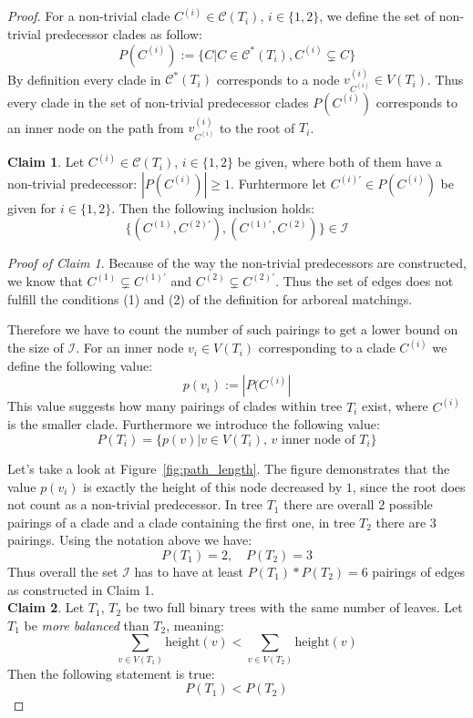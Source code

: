 \begin{proof}
For a non-trivial clade $C^{(i)} \in \mathcal{C}(T_i)$, $i \in \{1,2\}$, we define the set of non-trivial predecessor clades as follow:
$$P(C^{(i)}) := \{C | C \in \mathcal{C}^*(T_i), C^{(i)} \subsetneq C\}$$ 
By definition every clade in $\mathcal{C}^*(T_i)$ corresponds to a node $v^{(i)}_{C^{(i)}} \in V(T_i)$. Thus every clade in the set of non-trivial predecessor clades $P(C^{(i)})$ corresponds to an inner node on the path from $v^{(i)}_{C^{(i)}}$ to the root of $T_i$.

\textbf{Claim 1}. Let $C^{(i)} \in \mathcal{C}(T_i)$, $i \in \{1,2\}$ be given, where both of them have a non-trivial predecessor: $|P(C^{(i)})| \geq 1$. Furhtermore let $C^{(i)'} \in P(C^{(i)})$ be given for $i \in \{1,2\}$. Then the following inclusion holds:
$$ \{(C^{(1)},C^{(2)'}), (C^{(1)'}, C^{(2)})\} \in \mathcal{I}$$

\textit{Proof of Claim 1}. Because of the way the non-trivial predecessors are constructed, we know that $C^{(1)} \subsetneq C^{(1)'}$ and $C^{(2)} \subsetneq C^{(2)'}$. Thus the set of edges does not fulfill the conditions (1) and (2) of the definition for arboreal matchings.

Therefore we have to count the number of such pairings to get a lower bound on the size of $\mathcal{I}$. For an inner node $v_i \in V(T_i)$ corresponding to a clade $C^{(i)}$ we define the following value:
$$p(v_i) := |P(C^{(i)}|$$ 
This value suggests how many pairings of clades within tree $T_i$ exist, where $C^{(i)}$ is the smaller clade. Furthermore we introduce the following value:
$$P(T_i) = \{ p(v) | v \in V(T_i), \, v \text{ inner node of }T_i\} $$

Let's take a look at Figure~\ref{fig:path_length}. The figure demonstrates that the value $p(v_i)$ is exactly the height of this node decreased by $1$, since the root does not count as a non-trivial predecessor. In tree $T_1$ there are overall $2$ possible pairings of a clade and a clade containing the first one, in tree $T_2$ there are 3 pairings. Using the notation above we have:
$$ P(T_1) = 2,\quad P(T_2) = 3$$
Thus overall the set $\mathcal{I}$ has to have at least $P(T_1)*P(T_2)=6$ pairings of edges as constructed in Claim 1.\\

\textbf{Claim 2}. Let $T_1$, $T_2$ be two full binary trees with the same number of leaves. Let $T_1$ be \textit{more balanced} than $T_2$, meaning:
$$ \sum_{v \in V(T_1)} \text{height}(v) < \sum_{v \in V(T_2)} \text{height}(v)$$
Then the following statement is true:
$$P(T_1) < P(T_2)$$


\end{proof}
